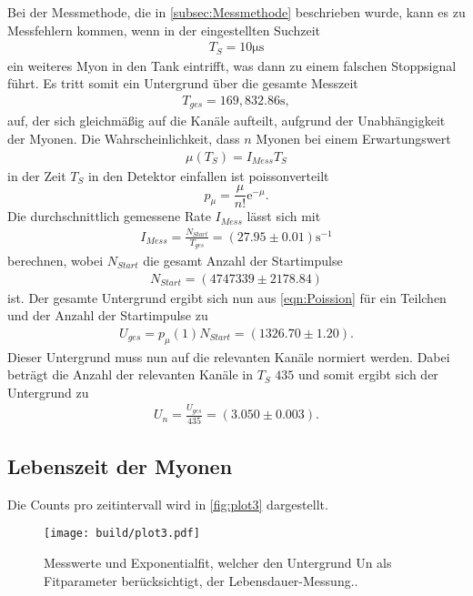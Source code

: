 Bei der Messmethode, die in \autoref{subsec:Messmethode} beschrieben wurde, kann es zu Messfehlern kommen, wenn in der eingestellten Suchzeit
\begin{align}
  T_S = 10 \si{\micro\second}
  \label{eqn:Suchzeit}
\end{align}
ein weiteres Myon in den Tank eintrifft, was dann zu einem falschen Stoppsignal führt. 
Es tritt somit ein Untergrund über die gesamte Messzeit
\begin{align}
  T_{ges} = 169,832.86 \si{\second},
  \label{eqn:Messzeit}
\end{align}
auf, der sich gleichmäßig auf die Kanäle aufteilt, aufgrund der Unabhängigkeit der Myonen.
Die Wahrscheinlichkeit, dass $n$ Myonen bei einem Erwartungswert
\begin{align*}
  \mu(T_S) = I_{Mess} T_S
  \label{eqn:Erwartungswert}
\end{align*}
in der Zeit $T_S$ in den Detektor einfallen ist poissonverteilt
\begin{equation}
  p_{\mu} = \frac{\mu}{n!} \text{e}^{-\mu}.\label{eqn:Poission}
\end{equation}
Die durchschnittlich gemessene Rate $I_{Mess}$ lässt sich mit
\begin{align*}
  I_{Mess} = \frac{N_{Start}}{T_{ges}} = (27.95 \pm 0.01) \si{\second}^{-1}
\end{align*}
berechnen, wobei $N_{Start}$ die gesamt Anzahl der Startimpulse 
\begin{align*}
  N_{Start} = (4747339 \pm 2178.84) 
\end{align*}
ist.
Der gesamte Untergrund ergibt sich nun aus \autoref{eqn:Poission} für ein Teilchen und der Anzahl der Startimpulse zu
\begin{align}
  U_{ges} = p_{\mu}(1) N_{Start} = (1326.70 \pm 1.20).
\end{align}
Dieser Untergrund muss nun auf die relevanten Kanäle normiert werden. Dabei beträgt die Anzahl der relevanten Kanäle in $T_S$ $435$ und somit ergibt sich der Untergrund zu
\begin{align}
  U_n = \frac{U_{ges}}{435} = (3.050 \pm 0.003).
\end{align}

\subsection{Lebenszeit der Myonen}
\label{subsec:Lebenszeit}
Die Counts pro zeitintervall wird in \autoref{fig:plot3} dargestellt.
\begin{figure}[H]
  \centering
  \texttt{[image: build/plot3.pdf]}
  \caption {Messwerte und Exponentialfit, welcher den Untergrund Un als Fitparameter berücksichtigt, der Lebensdauer-Messung..}
  \label{fig:plot3}
\end{figure}